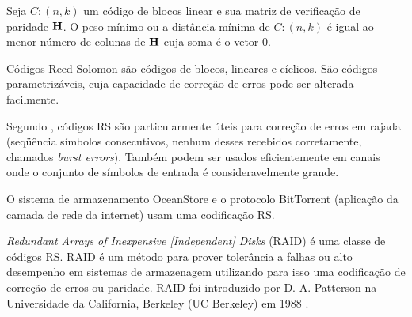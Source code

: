 \begin{corollary} Seja $C:(n,k)$ um código de blocos linear e sua matriz de verificação de paridade ${\bf H}$. O peso mínimo ou a distância mínima de $C:(n,k)$ é igual ao menor número de colunas de ${\bf H}$ cuja soma é o vetor $0$.
\end{corollary}


Códigos Reed-Solomon são códigos de blocos, lineares e cíclicos. São códigos parametrizáveis, cuja capacidade de correção de erros pode ser alterada facilmente. 



Segundo \cite{Almeida:2007}, códigos RS são particularmente úteis para correção de erros em rajada (seqüência símbolos consecutivos, nenhum desses recebidos corretamente, chamados \emph{burst errors}). Também podem ser usados eficientemente em canais onde o conjunto de símbolos de entrada é consideravelmente grande.


O sistema de armazenamento OceanStore \cite{Kubiatowicz:2000} e o protocolo BitTorrent (aplicação da camada de rede da internet) usam uma codificação RS.

\emph{Redundant Arrays of Inexpensive [Independent] Disks} (RAID) é uma classe de códigos RS. RAID é um método para prover tolerância a falhas ou alto desempenho em sistemas de armazenagem utilizando para isso uma codificação de correção de erros ou paridade. RAID foi introduzido por D. A. Patterson na Universidade da California, Berkeley (UC Berkeley) em 1988 \cite{Patterson:1988}. 

